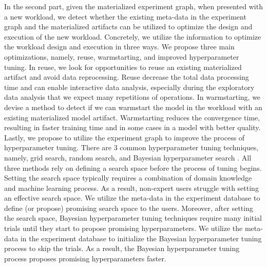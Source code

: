 In the second part, given the materialized experiment graph, when presented with a new workload, we detect whether the existing meta-data in the experiment graph and the materialized artifacts can be utilized to optimize the design and execution of the new workload.
Concretely, we utilize the information to optimize the workload design and execution in three ways.
We propose three main optimizations, namely, reuse, warmstarting, and improved hyperparameter tuning.
In reuse, we look for opportunities to reuse an existing materialized artifact and avoid data reprocessing.
Reuse decrease the total data processing time and can enable interactive data analysis, especially during the exploratory data analysis that we expect many repetitions of operations.
In warmstarting, we devise a method to detect if we can warmstart the model in the workload with an existing materialized model artifact.
Warmstarting reduces the convergence time, resulting in faster training time and in some cases in a model with better quality.
Lastly, we propose to utilize the experiment graph to improve the process of hyperparameter tuning.
There are 3 common hyperparameter tuning techniques, namely, grid search, random search, and Bayesian hyperparameter search \cite{hutter2011sequential,snoek2012practical}.
All three methods rely on defining a search space before the process of tuning begins.
Setting the search space typically requires a combination of domain knowledge and machine learning process.
As a result, non-expert users struggle with setting an effective search space.
We utilize the meta-data in the experiment database to define (or propose) promising search space to the users.
Moreover, after setting the search space, Bayesian hyperparameter tuning techniques require many initial trials until they start to propose promising hyperparameters.
We utilize the meta-data in the experiment database to initialize the Bayesian hyperparameter tuning process to skip the trials.
As a result, the Bayesian hyperparameter tuning process proposes promising hyperparameters faster.


